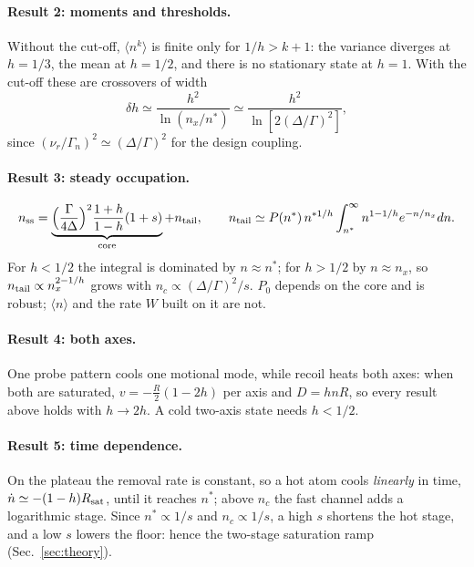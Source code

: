 \documentclass[11pt,a4paper]{article}
\newcommand{\nur}{\nu_r}
\begin{document}
\paragraph{Result 2: moments and thresholds.} Without the cut-off, $\langle n^k\rangle$ is finite only for $1/h>k+1$: the variance diverges at $h=1/3$, the mean at $h=1/2$, and there is no stationary state at $h=1$. With the cut-off these are crossovers of width
\begin{equation}
  \delta h\simeq\frac{h^2}{\ln(n_x/n^*)}\simeq\frac{h^2}{\ln[2(\Delta/\Gamma)^2]},
\end{equation}
since $(\nur/\Gamma_n)^2\simeq(\Delta/\Gamma)^2$ for the design coupling.

\paragraph{Result 3: steady occupation.}
\begin{equation}
  n_{\rm ss}=\underbrace{\Big(\frac{\Gamma}{4\Delta}\Big)^2\frac{1+h}{1-h}(1+s)}_{\text{core}}+n_{\rm tail},\qquad
  n_{\rm tail}\simeq P(n^*)\,n^{*1/h}\int_{n^*}^{\infty}n^{1-1/h}e^{-n/n_x}dn .
\end{equation}
For $h<1/2$ the integral is dominated by $n\approx n^*$; for $h>1/2$ by $n\approx n_x$, so $n_{\rm tail}\propto n_x^{2-1/h}$ grows with $n_c\propto(\Delta/\Gamma)^2/s$. $P_0$ depends on the core and is robust; $\langle n\rangle$ and the rate $W$ built on it are not.

\paragraph{Result 4: both axes.} One probe pattern cools one motional mode, while recoil heats both axes: when both are saturated, $v=-\tfrac R2(1-2h)$ per axis and $D=hnR$, so every result above holds with $h\to2h$. A cold two-axis state needs $h<1/2$.

\paragraph{Result 5: time dependence.} On the plateau the removal rate is constant, so a hot atom cools \emph{linearly} in time, $\dot n\simeq-(1-h)R_{\rm sat}$, until it reaches $n^*$; above $n_c$ the fast channel adds a logarithmic stage. Since $n^*\propto1/s$ and $n_c\propto1/s$, a high $s$ shortens the hot stage, and a low $s$ lowers the floor: hence the two-stage saturation ramp (Sec.~\ref{sec:theory}).
\end{document}
